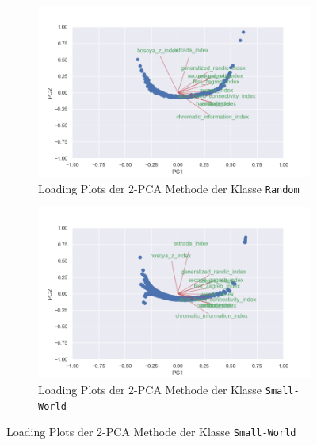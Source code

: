 \begin{figure}[H]
    \centering
    \begin{subfigure}{.5\textwidth}
        \includegraphics[width=\textwidth]{images/30_results/random-pca-loadings.png}
        \caption{Loading Plots der 2-PCA Methode der Klasse \texttt{Random}}
        \label{fig:pca-loading-random}
    \end{subfigure}%
    \begin{subfigure}{.5\textwidth}
        \includegraphics[width=\textwidth]{images/30_results/smallworld-pca-loadings.png}
        \caption{Loading Plots der 2-PCA Methode der Klasse \texttt{Small-World}}
        \label{fig:pca-loading-smallworld}
    \end{subfigure}


\end{figure}
